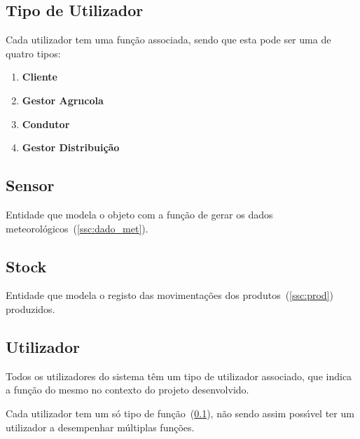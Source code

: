 \documentclass[12pt, a4paper]{article}
\begin{document}

\subsection{Tipo de Utilizador}\label{ssc:tipo_user}

Cada utilizador tem uma função associada, sendo que esta pode ser uma de quatro tipos:

\begin{enumerate}
    \item \textbf{Cliente}
    \item \textbf{Gestor Agr\i{\i}cola}
    \item \textbf{Condutor}
    \item \textbf{Gestor Distribui\c{c}\~ao}
\end{enumerate}



\subsection{Sensor}\label{ssc:sensor}

Entidade que modela o objeto com a fun\c{c}\~ao de gerar os
dados meteorol\'ogicos~(\ref{ssc:dado_met}).


\subsection{Stock}\label{ssc:stock}

Entidade que modela o registo das movimenta\c{c}\~oes dos produtos~(\ref{ssc:prod}) produzidos.


\subsection{Utilizador}\label{ssc:user}

Todos os utilizadores do sistema t\^em um tipo de utilizador associado,
que indica a fun\c{c}\~ao do mesmo no contexto do projeto desenvolvido.

Cada utilizador tem um s\'o tipo de função~(\ref{ssc:tipo_user}), não sendo assim poss\'{\i}vel
ter um utilizador a desempenhar m\'ultiplas fun\c{c}\~oes.


\end{document}
